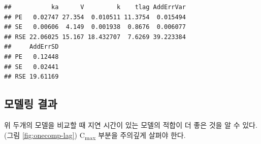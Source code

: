 \documentclass[
  11pt,
  krantz2, a4paper, twoside]{krantz}
\newenvironment{Shaded}{\begin{snugshade}}{\end{snugshade}}
\newcommand{\AttributeTok}[1]{\textcolor[rgb]{0.77,0.63,0.00}{#1}}
\newcommand{\DecValTok}[1]{\textcolor[rgb]{0.00,0.00,0.81}{#1}}
\newcommand{\FloatTok}[1]{\textcolor[rgb]{0.00,0.00,0.81}{#1}}
\newcommand{\FunctionTok}[1]{\textcolor[rgb]{0.00,0.00,0.00}{#1}}
\newcommand{\NormalTok}[1]{#1}
\newcommand{\OtherTok}[1]{\textcolor[rgb]{0.56,0.35,0.01}{#1}}
\newcommand{\SpecialCharTok}[1]{\textcolor[rgb]{0.00,0.00,0.00}{#1}}
\newcommand{\StringTok}[1]{\textcolor[rgb]{0.31,0.60,0.02}{#1}}
\theoremstyle{definition}
\theoremstyle{definition}
\theoremstyle{definition}
\theoremstyle{definition}
\theoremstyle{remark}
\begin{document}
\begin{verbatim}
##           ka      V         k    tlag AddErrVar
## PE   0.02747 27.354  0.010511 11.3754  0.015494
## SE   0.00606  4.149  0.001938  0.8676  0.006077
## RSE 22.06025 15.167 18.432707  7.6269 39.223384
##     AddErrSD
## PE   0.12448
## SE   0.02441
## RSE 19.61169
\end{verbatim}

\normalsize

\hypertarget{uxbaa8uxb378uxb9c1-uxacb0uxacfc}{%
\subsection{모델링 결과}\label{uxbaa8uxb378uxb9c1-uxacb0uxacfc}}

위 두개의 모델을 비교할 때 지연 시간이 있는 모델의 적합이 더 좋은 것을 알 수 있다. (그림 \ref{fig:onecomp-lag}) C\textsubscript{max} 부분을 주의깊게 살펴야 한다. 

\begin{Shaded}
\end{Shaded}
\end{document}

